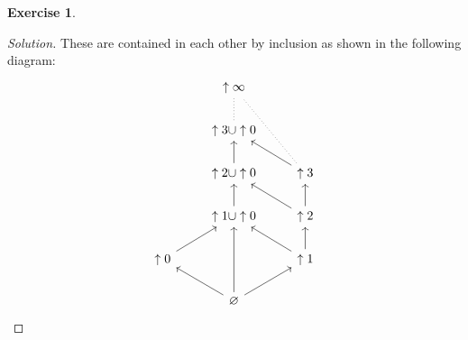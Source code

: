 \documentclass{article}
\renewcommand{\qedsymbol}{\raisebox{-0.5cm}{}}
\newenvironment{solution}{\begin{proof}[Solution]\renewcommand\qedsymbol{}}{\end{proof}}
\theoremstyle{definition}
\newtheorem{question}{Exercise}
\begin{document}
\begin{question}
\begin{enumerate}[(a)]
\begin{solution}
                  These are contained in each other by inclusion as shown in the
                  following diagram:
                  \[
                      \begin{tikzcd}[ampersand replacement=\&]
                          \& \uparrow\infty \\
                          \& \uparrow3\cup\uparrow0 \\
                          \& \uparrow2\cup\uparrow0 \& \uparrow3 \\
                          \& \uparrow1\cup\uparrow0 \& \uparrow2 \\
                          \uparrow0 \&\& \uparrow1 \\
                          \& \varnothing
                          \arrow[from=4-2, to=3-2]
                          \arrow[from=3-2, to=2-2]
                          \arrow[dotted, no head, from=2-2, to=1-2]
                          \arrow[from=6-2, to=4-2]
                          \arrow[from=6-2, to=5-1]
                          \arrow[from=5-1, to=4-2]
                          \arrow[from=6-2, to=5-3]
                          \arrow[from=5-3, to=4-2]
                          \arrow[from=5-3, to=4-3]
                          \arrow[from=4-3, to=3-2]
                          \arrow[from=4-3, to=3-3]
                          \arrow[from=3-3, to=2-2]
                          \arrow[dotted, no head, from=3-3, to=1-2]
                      \end{tikzcd}
                  \]
              \end{solution}
    \end{enumerate}
\end{question}
\end{document}
